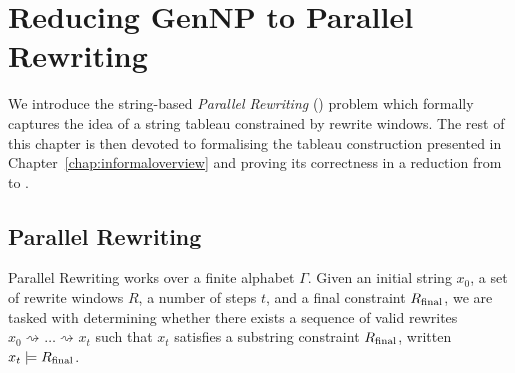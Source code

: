 \newcommand{\winw}[2]{\textsf{window}_{#1}{(#2)}}
\newcommand{\win}[1]{\textsf{window}{(#1)}}
\newcommand{\str}[1]{\textsf{string}{(#1)}}
\newcommand{\prem}[1]{\textsf{prem}~#1}
\newcommand{\conc}[1]{\textsf{conc}~#1}
\newcommand{\rewHead}[3]{\textsf{rewHead}~#1~(#2)~(#3)}
\newcommand{\rewAt}[4]{\textsf{rewAt}~#1~#2~#3~#4}
\newcommand{\prefix}[2]{\textsf{prefix}~#1~#2}

\newcommand{\strentE}[1]{\rightsquigarrow_{#1}^E}
\renewcommand{\strent}[1]{\rightsquigarrow_{#1}}

\newcommand{\pFlip}[1]{\textsf{pFlip}~#1}
\newcommand{\pFlipi}[1]{\textasciitilde#1}
\newcommand{\pRev}{\textsf{pRev}}

\newcommand{\nilstr}[2]{E~#1~#2}

\newcommand{\divides}{\mid}
\newcommand{\notdivides}{\nmid}

\newcommand{\Rtape}{\ensuremath{R_{\text{t}}}}

\newcommand{\trewwin}[6]{
  \begin{tikzpicture}
    \draw[thick] (0, 0) -- (2.25, 0);
    \draw (0.75, -0.75) -- (0.75, 0.75);
    \draw (1.5, -0.75) -- (1.5, 0.75);
    \node at (0.375, 0.375) {\ensuremath{#1}};
    \node at (0.375, -0.375) {\ensuremath{#4}};
    \node at (1.125, 0.375) {\ensuremath{#2}};
    \node at (1.125, -0.375) {\ensuremath{#5}};
    \node at (1.875, 0.375) {\ensuremath{#3}};
    \node at (1.875, -0.375) {\ensuremath{#6}};
  \end{tikzpicture}
}

\newcommand*{\irewwin}[6]{\ensuremath{[#1, #2, #3]~/~[#4, #5, #6]}}

\chapter{Reducing GenNP to Parallel Rewriting}\label{chap:gennp_pr}
We introduce the string-based \emph{Parallel Rewriting} (\PR{}) problem which formally captures the idea of a string tableau constrained by rewrite windows. The rest of this chapter is then devoted to formalising the tableau construction presented in Chapter~\ref{chap:informaloverview} and proving its correctness in a reduction from \gennp{} to \PR{}.

\section{Parallel Rewriting}\label{sec:pr}
Parallel Rewriting works over a finite alphabet $\Gamma$. Given an initial string $x_0$, a set of rewrite windows $R$, a number of steps $t$, and a final constraint $R_{\text{final}}$, we are tasked with determining whether there exists a sequence of valid rewrites $x_0 \strent{} \ldots \strent{} x_t$ such that $x_t$ satisfies a substring constraint $R_{\text{final}}$, written $x_t \models R_{\text{final}}$.

